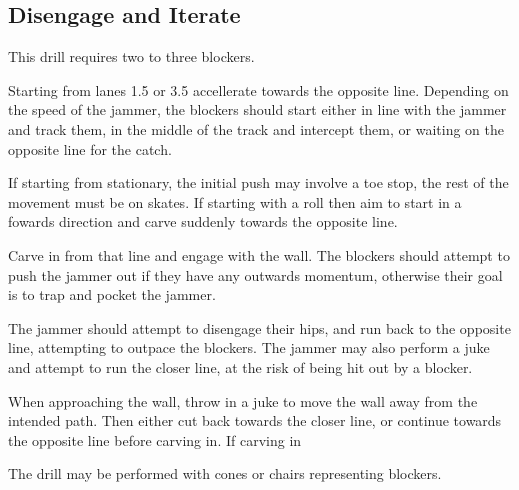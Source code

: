 \subsection*{Disengage and Iterate}
\label{drill:line_to_line_jamming:iterate}

This drill requires two to three blockers.

Starting from lanes 1.5 or 3.5 accellerate towards the opposite line.
Depending on the speed of the jammer, the blockers should start either in line with the jammer and track them, in the middle of the track and intercept them, or waiting on the opposite line for the catch.


If starting from stationary, the initial push may involve a toe stop, the rest of the movement must be on skates.
If starting with a roll then aim to start in a fowards direction and carve suddenly towards the opposite line.

Carve in from that line and engage with the wall.
The blockers should attempt to push the jammer out if they have any outwards momentum, otherwise their goal is to trap and pocket the jammer. 

The jammer should attempt to disengage their hips, and run back to the opposite line, attempting to outpace the blockers.
The jammer may also perform a juke and attempt to run the closer line, at the risk of being hit out by a blocker. 


When approaching the wall, throw in a juke to move the wall away from the intended path.
Then either cut back towards the closer line, or continue towards the opposite line before carving in. 
If carving in 

The drill may be performed with cones or chairs representing blockers. 
